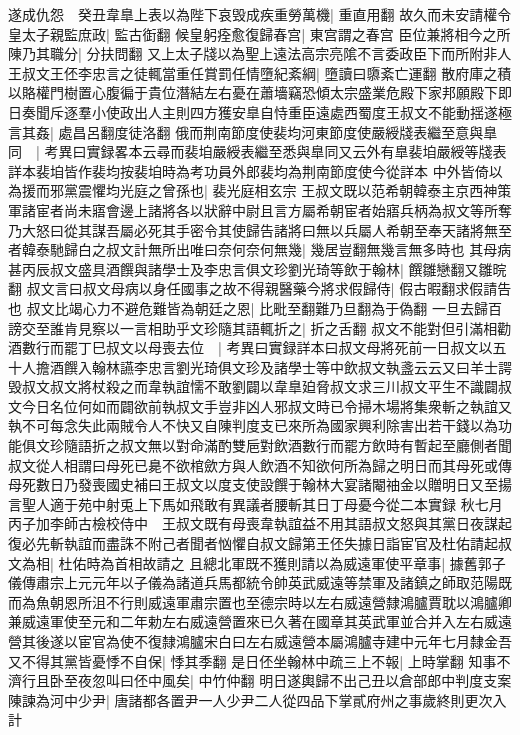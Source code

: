 遂成仇怨　癸丑韋臯上表以為陛下哀毁成疾重勞萬機|{
	重直用翻}
故久而未安請權令皇太子親監庶政|{
	監古衘翻}
候皇躬痊愈復歸春宫|{
	東宫謂之春宫}
臣位兼將相今之所陳乃其職分|{
	分扶問翻}
又上太子牋以為聖上遠法高宗亮隂不言委政臣下而所附非人王叔文王伾李忠言之徒輒當重任賞罰任情墮紀紊綱|{
	墮讀曰隳紊亡運翻}
散府庫之積以賂權門樹置心腹徧于貴位潛結左右憂在蕭墻竊恐傾太宗盛業危殿下家邦願殿下即日奏聞斥逐羣小使政出人主則四方獲安臯自恃重臣遠處西蜀度王叔文不能動揺遂極言其姦|{
	處昌呂翻度徒洛翻}
俄而荆南節度使裴均河東節度使嚴綬牋表繼至意與臯同　|{
	考異曰實録畧本云尋而裴垍嚴綬表繼至悉與臯同又云外有臯裴垍嚴綬等牋表詳本裴垍皆作裴均按裴垍時為考功員外郎裴均為荆南節度使今從詳本}
中外皆倚以為援而邪黨震懼均光庭之曾孫也|{
	裴光庭相玄宗}
王叔文既以范希朝韓泰主京西神策軍諸宦者尚未寤會邊上諸將各以狀辭中尉且言方屬希朝宦者始寤兵柄為叔文等所奪乃大怒曰從其謀吾屬必死其手密令其使歸告諸將曰無以兵屬人希朝至奉天諸將無至者韓泰馳歸白之叔文計無所出唯曰奈何奈何無幾|{
	幾居豈翻無幾言無多時也}
其母病甚丙辰叔文盛具酒饌與諸學士及李忠言俱文珍劉光琦等飲于翰林|{
	饌雛戀翻又雛晥翻}
叔文言曰叔文母病以身任國事之故不得親醫藥今將求假歸侍|{
	假古暇翻求假請告也}
叔文比竭心力不避危難皆為朝廷之恩|{
	比毗至翻難乃旦翻為于偽翻}
一旦去歸百謗交至誰肯見察以一言相助乎文珍隨其語輒折之|{
	折之舌翻}
叔文不能對但引滿相勸酒數行而罷丁巳叔文以母喪去位　|{
	考異曰實録詳本曰叔文母將死前一日叔文以五十人擔酒饌入翰林讌李忠言劉光琦俱文珍及諸學士等中飲叔文執盞云云又曰羊士諤毁叔文叔文將杖殺之而韋執誼懦不敢劉闢以韋臯廹脅叔文求三川叔文平生不識闢叔文今日名位何如而闢欲前執叔文手豈非凶人邪叔文時已令掃木場將集衆斬之執誼又執不可每念失此兩賊令人不快又自陳判度支已來所為國家興利除害出若干錢以為功能俱文珍隨語折之叔文無以對命滿酌雙巵對飲酒數行而罷方飲時有暫起至廳側者聞叔文從人相謂曰母死已臰不欲棺歛方與人飲酒不知欲何所為歸之明日而其母死或傳母死數日乃發喪國史補曰王叔文以度支使設饌于翰林大宴諸閹䄂金以贈明日又至揚言聖人適于苑中射兎上下馬如飛敢有異議者腰斬其日丁母憂今從二本實録}
秋七月丙子加李師古檢校侍中　王叔文既有母喪韋執誼益不用其語叔文怒與其黨日夜謀起復必先斬執誼而盡誅不附己者聞者忷懼自叔文歸第王伾失據日詣宦官及杜佑請起叔文為相|{
	杜佑時為首相故請之}
且總北軍既不獲則請以為威遠軍使平章事|{
	據舊郭子儀傳肅宗上元元年以子儀為諸道兵馬都統令帥英武威遠等禁軍及諸鎮之師取范陽既而為魚朝恩所沮不行則威遠軍肅宗置也至德宗時以左右威遠營隸鴻臚賈耽以鴻臚卿兼威遠軍使至元和二年勅左右威遠營置來已久著在國章其英武軍並合并入左右威遠營其後遂以宦官為使不復隸鴻臚宋白曰左右威遠營本屬鴻臚寺建中元年七月隸金吾}
又不得其黨皆憂悸不自保|{
	悸其季翻}
是日伾坐翰林中疏三上不報|{
	上時掌翻}
知事不濟行且卧至夜忽叫曰伾中風矣|{
	中竹仲翻}
明日遂輿歸不出己丑以倉部郎中判度支案陳諫為河中少尹|{
	唐諸都各置尹一人少尹二人從四品下掌貳府州之事歲終則更次入計}
